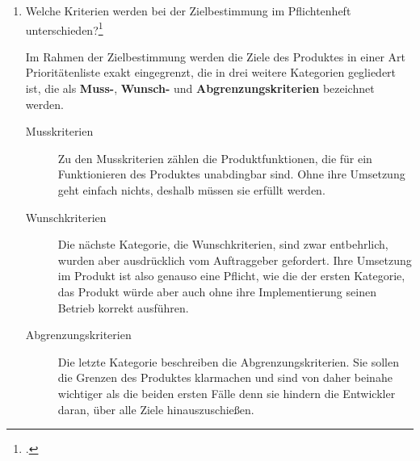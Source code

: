 \documentclass{bschlangaul-aufgabe}
\begin{document}

\begin{enumerate}


\item Welche Kriterien werden bei der Zielbestimmung im
Pflichtenheft unterschieden?\footcite{examen:66116:2016:09}

\begin{bAntwort}
Im Rahmen der Zielbestimmung werden die Ziele des Produktes in einer Art
Prioritätenliste exakt eingegrenzt, die in drei weitere Kategorien
gegliedert ist, die als \textbf{Muss-}, \textbf{Wunsch-} und
\textbf{Abgrenzungskriterien} bezeichnet werden.

\begin{description}
\item[Musskriterien] Zu den Musskriterien zählen die Produktfunktionen,
die für ein Funktionieren des Produktes unabdingbar sind. Ohne ihre
Umsetzung geht einfach nichts, deshalb müssen sie erfüllt werden.

\item[Wunschkriterien] Die nächste Kategorie, die Wunschkriterien, sind
zwar entbehrlich, wurden aber ausdrücklich vom Auftraggeber gefordert.
Ihre Umsetzung im Produkt ist also genauso eine Pflicht, wie die der
ersten Kategorie, das Produkt würde aber auch ohne ihre Implementierung
seinen Betrieb korrekt ausführen.

\item[Abgrenzungskriterien] Die letzte Kategorie  beschreiben die
Abgrenzungskriterien. Sie sollen die Grenzen des Produktes klarmachen
und sind von daher beinahe wichtiger als die beiden ersten Fälle denn
sie hindern die Entwickler daran, über alle Ziele hinauszuschießen.
\end{description}


\end{bAntwort}
\end{enumerate}
\end{document}
